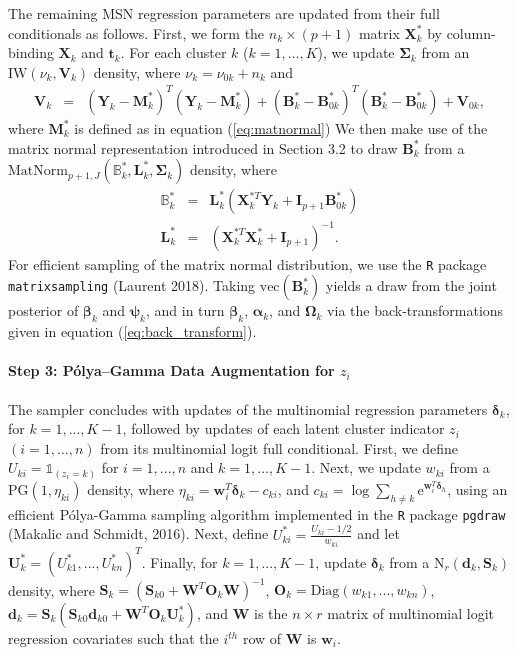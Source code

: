 \documentclass[useAMS,referee]{biom}
\begin{document}
The remaining MSN regression parameters are updated from their full conditionals as follows. First, we form the $n_k \times (p + 1)$ matrix $\mathbf{X}^*_k$ by column-binding $\mathbf{X}_k$ and $\mathbf{t}_k$. For each cluster $k$ ($k = 1,...,K$), we update $\boldsymbol\Sigma_k$ from an $\text{IW}(\nu_k,\mathbf{V}_k)$ density, where $\nu_k = \nu_{0k} + n_k$ and\begin{eqnarray}
	\mathbf{V}_k &=&  (\mathbf{Y}_k-\mathbf{M}^*_k)^T (\mathbf{Y}_k - \mathbf{M}^*_k) + (\mathbf{B}_k^* - \mathbf{B}^*_{0k})^T (\mathbf{B}^*_k - \mathbf{B}^*_{0k}) + \mathbf{V}_{0k}, \nonumber
\end{eqnarray} where $\mathbf{M}^*_k$ is defined as in equation (\ref{eq:matnormal})
We then make use of the matrix normal representation introduced in Section 3.2 to draw $\mathbf{B}^*_k$ from a $\text{MatNorm}_{p+1,J}(\mathbb{B}_k^*,\mathbf{L}_k^{*},\boldsymbol\Sigma_k)$ density, where
\begin{eqnarray}
	\mathbb{B}^*_k &=& \mathbf{L}_k^{*} (\mathbf{X}^{*T}_k \mathbf{Y}_k + \mathbf{I}_{p+1} \mathbf{B}^*_{0k}) \nonumber \\
	\mathbf{L}^*_k &=& (\mathbf{X}^{*T}_k \mathbf{X}^*_k + \mathbf{I}_{p+1})^{-1}. \nonumber
\end{eqnarray}
For efficient sampling of the matrix normal distribution, we use the \texttt{R} package \texttt{matrixsampling} (Laurent 2018). Taking $\text{vec}(\mathbf{B}^*_k)$ yields a draw from the joint posterior of $\boldsymbol\beta_k$ and $\boldsymbol\psi_k$, and in turn $\boldsymbol\beta_k$, $\boldsymbol\alpha_k$, and $\boldsymbol\Omega_k$ via the back-transformations given in equation (\ref{eq:back_transform}). 

\paragraph{\textbf{Step 3:} P\'olya--Gamma Data Augmentation for $z_i$} The sampler concludes with updates of the multinomial regression parameters $\boldsymbol\delta_k$, for $k = 1,...,K-1$, followed by updates of each latent cluster indicator $z_i$ $(i=1,\ldots,n)$ from its multinomial logit full conditional. First, we define $U_{ki} = \mathds{1}_{(z_i = k)}$ for $i = 1,...,n$ and $k = 1,...,K-1$. Next, we update ${w}_{ki}$ from a $\text{PG}(1,\eta_{ki})$ density, where $\eta_{ki} = \mathbf{w}_i^T \boldsymbol\delta_k - {c}_{ki}$, and ${c}_{ki} = \log \sum_{h \ne k} \text{e}^{\mathbf{w}_i^T \boldsymbol\delta_{h}}$, using an efficient P\'olya-Gamma sampling algorithm implemented in the \texttt{R} package \texttt{pgdraw} (Makalic and Schmidt, 2016). Next, define $U^*_{ki} = \frac{U_{ki} - 1/2}{{w}_{ki}}$ and let $\mathbf{U}^*_k = (U^*_{k1},...,U^*_{kn})^T$. Finally, for $k = 1,...,K-1$, update $\boldsymbol\delta_k$ from a $\text{N}_r(\mathbf{d}_k,\mathbf{S}_k)$ density, where $\mathbf{S}_k = (\mathbf{S}_{k0} + \mathbf{W}^T \mathbf{O}_k \mathbf{W})^{-1}$, $\mathbf{O}_k = \text{Diag}({w}_{k1},...,{w}_{kn})$,  $\mathbf{d}_k = \mathbf{S}_k (\mathbf{S}_{k0}\mathbf{d}_{k0} + \mathbf{W}^T \mathbf{O}_k \mathbf{U}^*_k)$, and $\mathbf{W}$ is the $n \times r$ matrix of multinomial logit regression covariates such that the $i^{th}$ row of $\mathbf{W}$ is $\mathbf{w}_i$.
\end{document}
